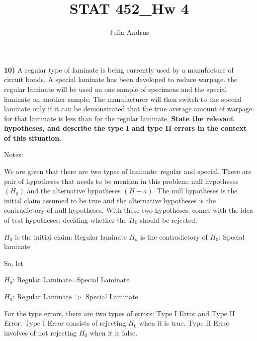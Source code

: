 \documentclass{article}
\title{STAT 452\_Hw 4}
\author{Julia Andrus}
\date{}
\begin{document}
\maketitle 



\textbf{10)} A regular type of laminate is being currently used by a manufacture of circuit bonds. A special laminate has been developed to reduce warpage. the regular laminate will be used on one sample of specimens and the special laminate on another sample. The manufacturer will then switch to the special laminate only if it can be demonstrated that the true average amount of warpage for that laminate is less than for the regular laminate. \textbf{State the relevant hypotheses, and describe the type I and type II errors in the context of this situation}.

\vspace{2mm}

Notes:
\vspace{2mm}

We are given that there are two types of laminate: regular and special. There are pair of hypotheses that needs to be mention in this problem: null hypotheses $(H_{0})$ and the alternative hypotheses $(H-{a})$. The null hypotheses is the initial claim assumed to be true and the alternative hypotheses is the contradictory of null hypotheses. With these two hypotheses, comes with the idea of test hypotheses: deciding whether the $H_{0}$ should be rejected.

\vspace{2mm}

$H_{0}$ is the initial claim: Regular laminate
\vspace{2mm}
$H_{a}$ is the contradictory of $H_{0}$: Special laminate

\vspace{2mm}

So, let  

\vspace{2mm}
$H_{0}$: Regular Laminate=Special Laminate

\vspace{2mm}

$H_{a}$: Regular Laminate $>$ Special Laminate 

\vspace{2mm}

For the type errors, there are two types of errors: Type I Error and Type II Error. Type I Error consists
of rejecting $H_{0}$ when it is true.  Type II Error involves of not rejecting $H_{0}$ when it is false.
\end{document}
